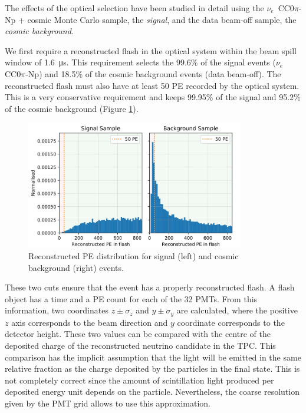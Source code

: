 The effects of the optical selection have been studied in detail using the $\nu_{e}$~CC0$\pi$-Np + cosmic Monte Carlo sample, the \emph{signal}, and the data beam-off sample, the \emph{cosmic background}.

We first require a reconstructed flash in the optical system within the beam spill window of \SI{1.6}{\micro\s}. This requirement selects the 99.6\% of the signal events ($\nu_{e}$ CC0$\pi$-Np) and 18.5\% of the cosmic background events (data beam-off). 
The reconstructed flash must also have at least 50 PE recorded by the optical system. This is a very conservative requirement and keeps 99.95\% of the signal and 95.2\% of the cosmic background (Figure \ref{fig:pe_cut}).

\begin{figure}[htbp]
\centering
\includegraphics[width=0.85\textwidth]{figures/pe_cut.jpg} 
\caption{Reconstructed PE distribution for signal (left) and cosmic background (right) events.} 
\label{fig:pe_cut}
\end{figure}

These two cuts ensure that the event has a properly reconstructed flash. A flash object has a time and a PE count for each of the 32 PMTs. From this information, two coordinates $z\pm \sigma_z$ and $y\pm \sigma_y$ are calculated, where the positive $z$ axis corresponds to the beam direction and $y$ coordinate corresponds to the detector height. These two values can be compared with the centre of the deposited charge of the reconstructed neutrino candidate in the TPC. This comparison has the implicit assumption that the light will be emitted in the same relative fraction as the charge deposited by the particles in the final state. This is not completely correct since the amount of scintillation light produced per deposited energy unit depends on the particle. Nevertheless, the coarse resolution given by the PMT grid allows to use this approximation.

